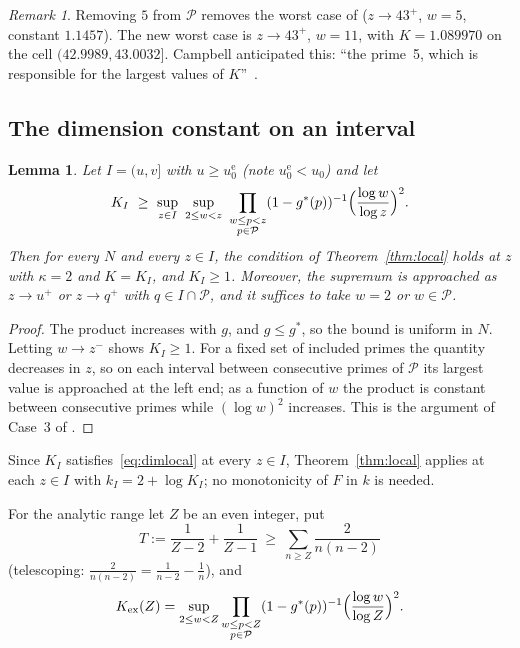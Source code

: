\documentclass[preprint,11pt]{elsarticle}
\newtheorem{lemma}[theorem]{Lemma}
\theoremstyle{definition}
\theoremstyle{remark}
\newtheorem{remark}[theorem]{Remark}
\newcommand{\cP}{\mathcal{P}}
\numberwithin{equation}{section}
\begin{document}
\begin{remark}
Removing $5$ from $\cP$ removes the worst case of
\cite[Lemma~4.1]{Campbell2026} ($z\to43^+$, $w=5$, constant $1.1457$).
The new worst case is $z\to43^+$, $w=11$, with $K=1.089970$ on the cell
$(42.9989,43.0032]$. Campbell anticipated this: ``the prime~5, which is
responsible for the largest values of $K$''~\cite[\S6]{Campbell2026}.
\end{remark}

\subsection{The dimension constant on an interval}

\begin{lemma}\label{lem:Kcell}
Let $I=(u,v]$ with $u\ge u_0^{\mathrm{e}}$ (note $u_0^{\mathrm{e}}<u_0$) and let
\[
  K_I\ \ge\ \sup_{z\in I}\ \sup_{2\le w<z}\
  \prod_{\substack{w\le p<z\\ p\in\cP}}(1-g^*(p))^{-1}
  \Bigl(\frac{\log w}{\log z}\Bigr)^{2}.
\]
Then for every $N$ and every $z\in I$, the condition of
Theorem~\ref{thm:local} holds at $z$ with $\kappa=2$ and $K=K_I$, and $K_I\ge1$.
Moreover, the supremum is approached as $z\to u^+$ or $z\to q^+$ with
$q\in I\cap\cP$, and it suffices to take $w=2$ or $w\in\cP$.
\end{lemma}

\begin{proof}
The product increases with $g$, and $g\le g^*$, so the bound is uniform in
$N$. Letting $w\to z^-$ shows $K_I\ge1$. For a fixed set of included primes
the quantity decreases in $z$, so on each interval between consecutive
primes of $\cP$ its largest value is approached at the left end; as a
function of $w$ the product is constant between consecutive primes while
$(\log w)^2$ increases. This is the argument of Case~3 of
\cite[Lemma~4.1]{Campbell2026}.
\end{proof}

Since $K_I$ satisfies~\eqref{eq:dimlocal} at every $z\in I$, Theorem~\ref{thm:local}
applies at each $z\in I$ with $k_I=2+\log K_I$; no monotonicity of $F$ in
$k$ is needed.

For the analytic range let $Z$ be an even integer, put
\[
  T:=\frac1{Z-2}+\frac1{Z-1}\ \ge\ \sum_{n\ge Z}\frac{2}{n(n-2)}
\]
(telescoping: $\frac{2}{n(n-2)}=\frac1{n-2}-\frac1n$), and
\[
  K_{\mathrm{ex}}(Z)=\sup_{2\le w<Z}\prod_{\substack{w\le p<Z\\ p\in\cP}}(1-g^*(p))^{-1}\Bigl(\frac{\log w}{\log Z}\Bigr)^2 .
\]
\end{document}
